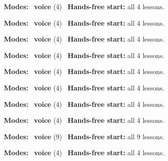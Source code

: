 \expandafter\def\csname hlchaptermodality24\endcsname{%
  {\small\noindent
    \textbf{Modes:} \hlvoicesign{}~\textbf{voice} (4)\quad
    \hlvoicesign{}~\textbf{Hands-free start:} all 4 lessons.%
    \par}\medskip
}

\expandafter\def\csname hlchaptermodality25\endcsname{%
  {\small\noindent
    \textbf{Modes:} \hlvoicesign{}~\textbf{voice} (4)\quad
    \hlvoicesign{}~\textbf{Hands-free start:} all 4 lessons.%
    \par}\medskip
}

\expandafter\def\csname hlchaptermodality26\endcsname{%
  {\small\noindent
    \textbf{Modes:} \hlvoicesign{}~\textbf{voice} (4)\quad
    \hlvoicesign{}~\textbf{Hands-free start:} all 4 lessons.%
    \par}\medskip
}

\expandafter\def\csname hlchaptermodality27\endcsname{%
  {\small\noindent
    \textbf{Modes:} \hlvoicesign{}~\textbf{voice} (4)\quad
    \hlvoicesign{}~\textbf{Hands-free start:} all 4 lessons.%
    \par}\medskip
}

\expandafter\def\csname hlchaptermodality28\endcsname{%
  {\small\noindent
    \textbf{Modes:} \hlvoicesign{}~\textbf{voice} (4)\quad
    \hlvoicesign{}~\textbf{Hands-free start:} all 4 lessons.%
    \par}\medskip
}

\expandafter\def\csname hlchaptermodality29\endcsname{%
  {\small\noindent
    \textbf{Modes:} \hlvoicesign{}~\textbf{voice} (4)\quad
    \hlvoicesign{}~\textbf{Hands-free start:} all 4 lessons.%
    \par}\medskip
}

\expandafter\def\csname hlchaptermodality30\endcsname{%
  {\small\noindent
    \textbf{Modes:} \hlvoicesign{}~\textbf{voice} (4)\quad
    \hlvoicesign{}~\textbf{Hands-free start:} all 4 lessons.%
    \par}\medskip
}

\expandafter\def\csname hlchaptermodality31\endcsname{%
  {\small\noindent
    \textbf{Modes:} \hlvoicesign{}~\textbf{voice} (4)\quad
    \hlvoicesign{}~\textbf{Hands-free start:} all 4 lessons.%
    \par}\medskip
}

\expandafter\def\csname hlchaptermodality32\endcsname{%
  {\small\noindent
    \textbf{Modes:} \hlvoicesign{}~\textbf{voice} (9)\quad
    \hlvoicesign{}~\textbf{Hands-free start:} all 9 lessons.%
    \par}\medskip
}

\expandafter\def\csname hlchaptermodality33\endcsname{%
  {\small\noindent
    \textbf{Modes:} \hlvoicesign{}~\textbf{voice} (4)\quad
    \hlvoicesign{}~\textbf{Hands-free start:} all 4 lessons.%
    \par}\medskip
}
